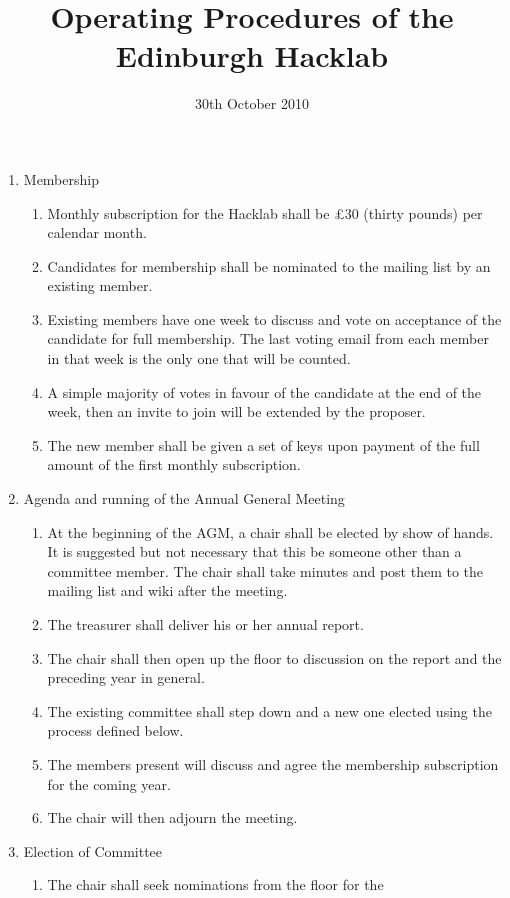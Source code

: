 \documentclass{article}
\title{Operating Procedures of the Edinburgh Hacklab}
\date{30th October 2010}
\begin{document}
\maketitle
\begin{enumerate}
\item Membership
  \begin{enumerate}
  \item Monthly subscription for the Hacklab shall be \pounds 30
    (thirty pounds) per calendar month.
  \item Candidates for membership shall be nominated to the mailing
    list by an existing member.
  \item Existing members have one week to discuss and vote on
    acceptance of the candidate for full membership. The last voting
    email from each member in that week is the only one that will be
    counted.
  \item A simple majority of votes in favour of the candidate at the
    end of the week, then an invite to join will be extended by the
    proposer.
  \item The new member shall be given a set of keys upon payment of
    the full amount of the first monthly subscription.
  \end{enumerate} %
\item Agenda and running of the Annual General Meeting
  \begin{enumerate}
  \item At the beginning of the AGM, a chair shall be elected by show
    of hands. It is suggested but not necessary that this be someone
    other than a committee member. The chair shall take minutes and
    post them to the mailing list and wiki after the meeting.
  \item The treasurer shall deliver his or her annual report.
  \item The chair shall then open up the floor to discussion on the
    report and the preceding year in general.
  \item The existing committee shall step down and a new one elected
    using the process defined below.
  \item The members present will discuss and agree the membership
    subscription for the coming year.
  \item The chair will then adjourn the meeting.
  \end{enumerate}
\item Election of Committee
  \begin{enumerate}
  \item The chair shall seek nominations from the floor for the

\end{enumerate}
\end{enumerate}
\end{document}
